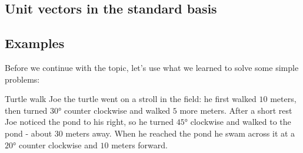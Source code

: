 
\subsection{Unit vectors in the standard basis}

\subsection{Examples}
Before we continue with the topic, let's use what we learned to solve some simple problems:

\begin{example}{Turtle walk}{}
  Joe the turtle went on a stroll in the field: he first walked $10$ meters, then turned $\ang{30}$ counter clockwise and walked $5$ more meters. After a short rest Joe noticed the pond to his right, so he turned $\ang{45}$ clockwise and walked to the pond - about $30$ meters away. When he reached the pond he swam across it at a $\ang{20}$ counter clockwise and $10$ meters forward.
\end{example}

